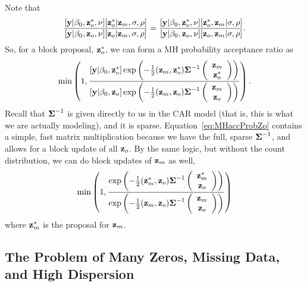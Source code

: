 \documentclass[11pt, titlepage]{article}
\begin{document}
\begin{spacing}{1.9}
\begin{flushleft}
Note that    
\[
\frac{[\mathbf{y}|\beta_{0},\mathbf{z}^{*}_{o},\nu][\mathbf{z}^{*}_{o}|\mathbf{z}_{m},\sigma,\rho]}
	{[\mathbf{y}|\beta_{0},\mathbf{z}_{o},\nu][\mathbf{z}_{o}|\mathbf{z}_{m},\sigma,\rho]} =
  \frac{[\mathbf{y}|\beta_{0},\mathbf{z}^{*}_{o},\nu][\mathbf{z}^{*}_{o}, \mathbf{z}_{m}|\sigma,\rho]}
	{[\mathbf{y}|\beta_{0},\mathbf{z}_{o},\nu][\mathbf{z}_{o}, \mathbf{z}_{m} | \sigma,\rho]}.
\]
So, for a block proposal, $\mathbf{z}_{o}^{*}$, we can form a MH probability acceptance ratio as
\begin{equation} \label{eq:MHaccProbZo}
\min\left(1,\frac{[\mathbf{y}|\beta_{0},\mathbf{z}^{*}_{o}]\exp\left(-\frac{1}{2}
(\mathbf{z}_{m},\mathbf{z}_{o}^{*})\mbox{\boldmath $\Sigma$}^{-1} \left(
	\begin{array}{c}
		\mathbf{z}_{m} \\
		\mathbf{z}_{o}^{*}
	\end{array}
	\right)
\right)}{[\mathbf{y}|\beta_{0},\mathbf{z}_{o}]\exp\left(-\frac{1}{2}
(\mathbf{z}_{m},\mathbf{z}_{o})\mbox{\boldmath $\Sigma$}^{-1} \left(
	\begin{array}{c}
		\mathbf{z}_{m} \\
		\mathbf{z}_{o}
	\end{array}
	\right)
\right)}
\right).
\end{equation}
Recall that $\mbox{\boldmath $\Sigma$}^{-1}$ is given directly to us in the CAR model (that is, this is what we are actually modeling), and it is sparse. Equation~\eqref{eq:MHaccProbZo} contains a simple, fast matrix multiplication because we have the full, sparse $\mbox{\boldmath $\Sigma$}^{-1}$, and allows for a block update of all $\mathbf{z}_{o}$.  By the same logic, but without the count distribution, we can do block updates of $\mathbf{z}_{m}$ as well, 
\begin{equation} \label{eq:MHaccProbZm}
\min\left(1,\frac{\exp\left(-\frac{1}{2}
(\mathbf{z}_{m}^{*},\mathbf{z}_{o})\mbox{\boldmath $\Sigma$}^{-1} \left(
	\begin{array}{c}
		\mathbf{z}_{m}^{*} \\
		\mathbf{z}_{o}
	\end{array}
	\right)
\right)}{\exp\left(-\frac{1}{2}
(\mathbf{z}_{m},\mathbf{z}_{o})\mbox{\boldmath $\Sigma$}^{-1} \left(
	\begin{array}{c}
		\mathbf{z}_{m} \\
		\mathbf{z}_{o}
	\end{array}
	\right)
\right)}
\right)
\end{equation}
where $\mathbf{z}^{*}_{m}$ is the proposal for $\mathbf{z}_{m}$.


\subsection{The Problem of Many Zeros, Missing Data, and High Dispersion}


\end{flushleft}
\end{spacing}
\end{document}
